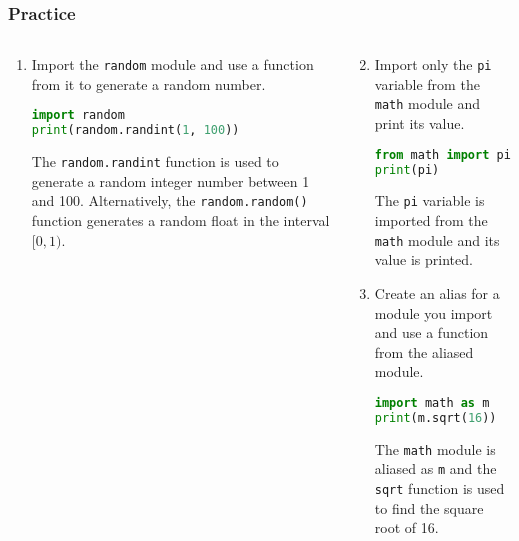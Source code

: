 \begin{frame}[fragile]
  \frametitle{Practice}
  \begin{columns}[T]
    \begin{column}{0.5\textwidth}
      \begin{enumerate}
        \item Import the \lstinline{random} module and use a function from it to generate a random number.\pause
        \begin{lstlisting}[language=Python]
import random
print(random.randint(1, 100))
        \end{lstlisting}
        The \lstinline{random.randint} function is used to generate a random integer number between 1 and 100. Alternatively, the \lstinline|random.random()| function generates a random float in the interval $[0,1)$.
      \end{enumerate}
    \end{column}

    \begin{column}{0.5\textwidth}
      \begin{enumerate}\setcounter{enumi}{1}
        \item Import only the \lstinline{pi} variable from the \lstinline{math} module and print its value.\pause
        \begin{lstlisting}[language=Python]
from math import pi
print(pi)
        \end{lstlisting}
        The \lstinline{pi} variable is imported from the \lstinline{math} module and its value is printed.
        \item Create an alias for a module you import and use a function from the aliased module. \pause
        \begin{lstlisting}[language=Python]
import math as m
print(m.sqrt(16))
        \end{lstlisting}
        The \lstinline{math} module is aliased as \lstinline{m} and the \lstinline{sqrt} function is used to find the square root of 16.
      \end{enumerate}
    \end{column}
  \end{columns}
\end{frame}


